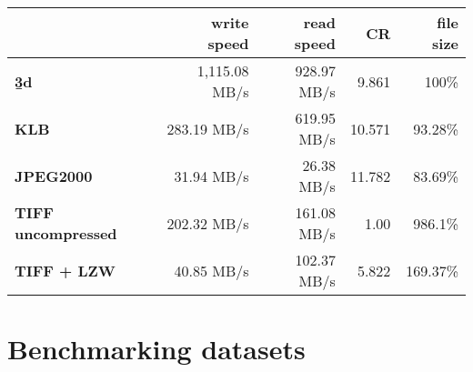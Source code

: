 \begin{table}[tbp]
  \renewcommand{\arraystretch}{2}
  \setlength{\tabcolsep}{9pt}
  \centering
  \begin{tabular}{lrrrr}
      & \textbf{write speed} & \textbf{read speed} & \textbf{CR} & \textbf{file size} \\
      \hline
      \hline
      \textbf{\b3d} & 1,115.08 MB/s & 928.97 MB/s & 9.861 & 100\% \\ \hline
      \textbf{KLB} & 283.19 MB/s & 619.95 MB/s & 10.571 & 93.28\% \\ \hline
      \textbf{JPEG2000} & 31.94 MB/s & 26.38 MB/s & 11.782 & 83.69\% \\ \hline
      \textbf{TIFF uncompressed} & 202.32 MB/s & 161.08 MB/s & 1.00 & 986.1\% \\ \hline
      \textbf{TIFF + LZW} & 40.85 MB/s & 102.37 MB/s & 5.822 & 169.37\%
  \end{tabular}
  \label{tab:performance}
\end{table}


\section*{Benchmarking datasets}


